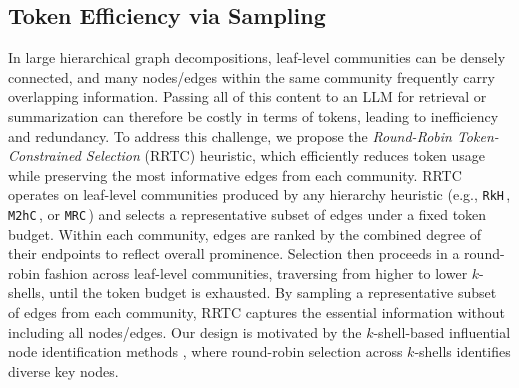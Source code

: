 \documentclass[sigconf]{acmart}
\newcommand{\KHC}{\texttt{RkH}\,}
\newcommand{\MHC}{\texttt{M2hC}\,}
\newcommand{\MRC}{\texttt{MRC}\,}
\begin{document}
\subsection{Token Efficiency via Sampling}\label{subsec:alg-token}

In large hierarchical graph decompositions, leaf-level communities can be densely connected, and many nodes/edges within the same community frequently carry overlapping information. Passing all of this content to an LLM for retrieval or summarization can therefore be costly in terms of tokens, leading to inefficiency and redundancy. To address this challenge, we propose the \textit{Round-Robin Token-Constrained Selection} (RRTC) heuristic, which efficiently reduces token usage while preserving the most informative edges from each community.
RRTC operates on leaf-level communities produced by any hierarchy heuristic (e.g., \KHC, \MHC, or \MRC) and selects a representative subset of edges under a fixed token budget. Within each community, edges are ranked by the combined degree of their endpoints to reflect overall prominence. Selection then proceeds in a round-robin fashion across leaf-level communities, traversing from higher to lower $k$-shells, until the token budget is exhausted. By sampling a representative subset of edges from each community, RRTC captures the essential information without including all nodes/edges.
Our design is motivated by the $k$-shell-based influential node identification methods \cite{wang20,hossain23}, where round-robin selection across $k$-shells identifies diverse key nodes.
\end{document}
